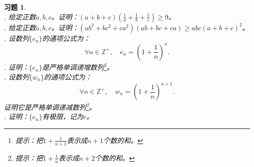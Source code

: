 \documentclass[12pt,UTF8]{ctexbook}
\newtheorem{xt}{习题}[section]
\begin{document}
\begin{xt}    
    \mbox{}\\
    . 给定正数$a,b,c$。证明：$(a + b + c)(\frac{1}{a}+\frac{1}{b}+\frac{1}{c}) \geqslant 9$。\\
    . 给定正数$a,b,c$。证明：$(ab^2 + bc^2 + ca^2)(ab + bc + ca) \geqslant abc(a+b+c)^2$。 \\
    . 设数列$\{e_n\}$的通项公式为：
    $$ \forall n\in\mathbb{Z}^+,\quad e_n = \left(1 + \frac{1}{n}\right)^n.$$
    . 证明：$\{e_n\}$是严格单调递增数列\footnote{提示：把$1 + \frac{1}{n+1}$表示成$n+1$个数的和。}。\\
    . 设数列$\{w_n\}$的通项公式为：
    $$ \forall n\in\mathbb{Z}^+,\quad w_n = \left(1 + \frac{1}{n}\right)^{n+1}.$$
    证明它是严格单调递减数列\footnote{提示：把$1 + \frac{1}{n}$表示成$n+2$个数的和。}。 \\
    . 证明：$\{e_n\}$有极限，记为$e$。\\
\end{xt}
\end{document}
